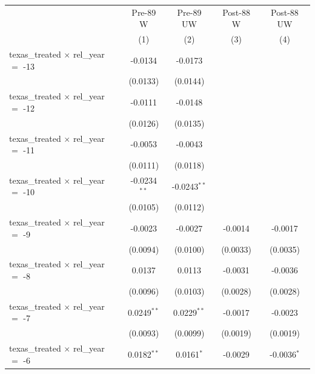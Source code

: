 
\begingroup
\centering
\begin{tabular}{lcccc}
   \toprule
                                                & Pre-89 W       & Pre-89 UW      & Post-88 W       & Post-88 UW \\   
                                                & (1)            & (2)            & (3)             & (4)\\  
   \midrule 
   texas\_treated $\times$ rel\_year $=$ -13    & -0.0134        & -0.0173        &                 &   \\   
                                                & (0.0133)       & (0.0144)       &                 &   \\   
   texas\_treated $\times$ rel\_year $=$ -12    & -0.0111        & -0.0148        &                 &   \\   
                                                & (0.0126)       & (0.0135)       &                 &   \\   
   texas\_treated $\times$ rel\_year $=$ -11    & -0.0053        & -0.0043        &                 &   \\   
                                                & (0.0111)       & (0.0118)       &                 &   \\   
   texas\_treated $\times$ rel\_year $=$ -10    & -0.0234$^{**}$ & -0.0243$^{**}$ &                 &   \\   
                                                & (0.0105)       & (0.0112)       &                 &   \\   
   texas\_treated $\times$ rel\_year $=$ -9     & -0.0023        & -0.0027        & -0.0014         & -0.0017\\   
                                                & (0.0094)       & (0.0100)       & (0.0033)        & (0.0035)\\   
   texas\_treated $\times$ rel\_year $=$ -8     & 0.0137         & 0.0113         & -0.0031         & -0.0036\\   
                                                & (0.0096)       & (0.0103)       & (0.0028)        & (0.0028)\\   
   texas\_treated $\times$ rel\_year $=$ -7     & 0.0249$^{**}$  & 0.0229$^{**}$  & -0.0017         & -0.0023\\   
                                                & (0.0093)       & (0.0099)       & (0.0019)        & (0.0019)\\   
   texas\_treated $\times$ rel\_year $=$ -6     & 0.0182$^{**}$  & 0.0161$^{*}$   & -0.0029         & -0.0036$^{*}$\\   

\end{tabular}
